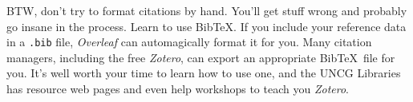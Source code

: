 \documentclass[%
 reprint,
 amsmath,amssymb,
 aps,
]{revtex4-2}
\begin{document}
BTW, don't try to format citations by hand. You'll get stuff wrong and probably go insane in the process. Learn to use Bib\TeX. If you include your reference data in a \texttt{.bib} file, \textit{Overleaf} can automagically format it for you. Many citation managers, including the free \textit{Zotero}, can export an appropriate Bib\TeX\ file for you. It's well worth your time to learn how to use one, and the UNCG Libraries has resource web pages and even help workshops to teach you \textit{Zotero}.

\end{document}

